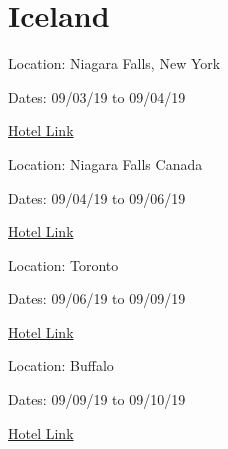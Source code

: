 \documentclass{article}
\begin{document}
\section{Iceland}\noindent Location: Niagara Falls, New York

\noindent Dates: 09/03/19 to 09/04/19

\href{http://www.hotels.com/search.do?Niagara%20Falls,%20New%20York&q-destination=Niagara%20Falls,%20New%20York&q-check-in=2019-09-03&q-check-out=2019-09-04&q-rooms=1&q-room-0-adults=4&q-room-0-children=0&sort-order=PRICE}{Hotel Link}

\noindent Location: Niagara Falls Canada

\noindent Dates: 09/04/19 to 09/06/19

\href{http://www.hotels.com/search.do?Niagara%20Falls%20Canada&q-destination=Niagara%20Falls%20Canada&q-check-in=2019-09-04&q-check-out=2019-09-06&q-rooms=1&q-room-0-adults=4&q-room-0-children=0&sort-order=PRICE}{Hotel Link}

\noindent Location: Toronto

\noindent Dates: 09/06/19 to 09/09/19

\href{http://www.hotels.com/search.do?Toronto&q-destination=Toronto&q-check-in=2019-09-06&q-check-out=2019-09-09&q-rooms=1&q-room-0-adults=4&q-room-0-children=0&sort-order=PRICE}{Hotel Link}

\noindent Location: Buffalo

\noindent Dates: 09/09/19 to 09/10/19

\href{http://www.hotels.com/search.do?Buffalo&q-destination=Buffalo&q-check-in=2019-09-09&q-check-out=2019-09-10&q-rooms=1&q-room-0-adults=4&q-room-0-children=0&sort-order=PRICE}{Hotel Link}
\end{document}
